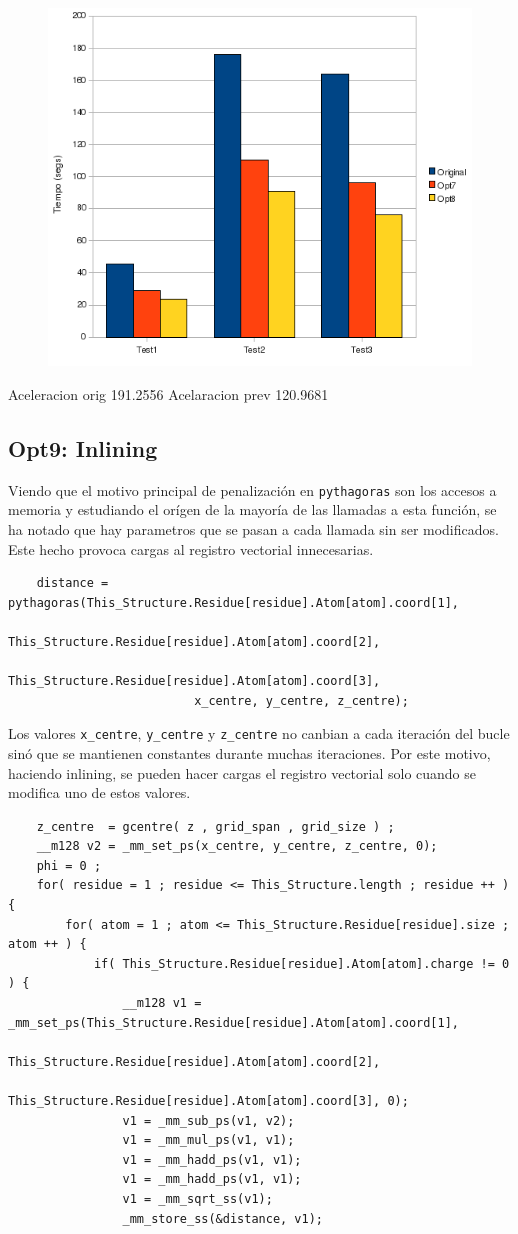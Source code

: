 \begin{figure}[ht]
   \centering
   \includegraphics[keepaspectratio=true,width=.6\textwidth]{figures/opt8-perf}
\end{figure}

Aceleracion orig	191.2556%
Acelaracion prev	120.9681%

\subsection{Opt9: Inlining}

Viendo que el motivo principal de penalizaci\'{o}n en \texttt{pythagoras} son
los accesos a memoria y estudiando el or\'{i}gen de la mayor\'{i}a de las
llamadas a esta funci\'{o}n, se ha notado que hay parametros que se pasan a cada
llamada sin ser modificados. Este hecho provoca cargas al registro vectorial
innecesarias.

\begin{lstlisting}
	distance = pythagoras(This_Structure.Residue[residue].Atom[atom].coord[1], 
						  This_Structure.Residue[residue].Atom[atom].coord[2], 
						  This_Structure.Residue[residue].Atom[atom].coord[3],
						  x_centre, y_centre, z_centre);
\end{lstlisting}
 
Los valores \texttt{x\_centre}, \texttt{y\_centre} y \texttt{z\_centre} no
canbian a cada iteraci\'{o}n del bucle sin\'{o} que se mantienen constantes
durante muchas iteraciones. Por este motivo, haciendo inlining, se pueden
hacer cargas el registro vectorial solo cuando se modifica uno de estos valores.

\begin{lstlisting}
	z_centre  = gcentre( z , grid_span , grid_size ) ;
	__m128 v2 = _mm_set_ps(x_centre, y_centre, z_centre, 0);
	phi = 0 ;
	for( residue = 1 ; residue <= This_Structure.length ; residue ++ ) {
		for( atom = 1 ; atom <= This_Structure.Residue[residue].size ; atom ++ ) {
			if( This_Structure.Residue[residue].Atom[atom].charge != 0 ) {
				__m128 v1 = _mm_set_ps(This_Structure.Residue[residue].Atom[atom].coord[1],
						This_Structure.Residue[residue].Atom[atom].coord[2],
						This_Structure.Residue[residue].Atom[atom].coord[3], 0);
				v1 = _mm_sub_ps(v1, v2);
				v1 = _mm_mul_ps(v1, v1);
				v1 = _mm_hadd_ps(v1, v1);
				v1 = _mm_hadd_ps(v1, v1);
				v1 = _mm_sqrt_ss(v1);	
				_mm_store_ss(&distance, v1);
\end{lstlisting}

